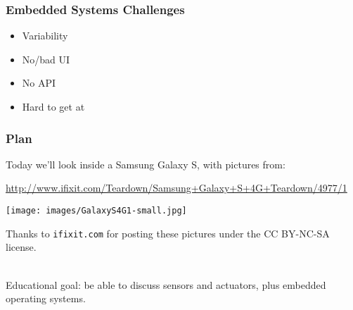 \begin{frame}
\frametitle{Embedded Systems Challenges}

\begin{itemize}
\item Variability 
\item No/bad UI 
\item No API 
\item Hard to get at 
\end{itemize}
\end{frame}

\begin{frame}
\frametitle{Plan}

Today we'll look inside a Samsung Galaxy S, with pictures from:

\begin{center}
\url{http://www.ifixit.com/Teardown/Samsung+Galaxy+S+4G+Teardown/4977/1}
\end{center}

\begin{center}
\texttt{[image: images/GalaxyS4G1-small.jpg]}
\end{center}

{\scriptsize Thanks to {\tt ifixit.com} for posting these pictures
under the CC BY-NC-SA license.}

~\\

Educational goal: be able to discuss sensors and actuators, plus embedded operating systems.

\end{frame}

